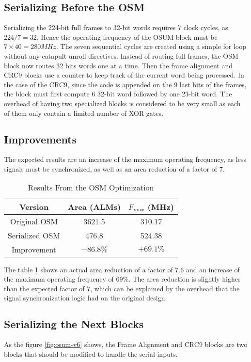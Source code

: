 \subsection{Serializing Before the OSM}

Serializing the 224-bit full frames to 32-bit words requires 7 clock cycles, as \(224/7=32\). Hence the operating frequency of the OSUM block must be \(7\times40=280MHz\). The seven sequential cycles are created using a simple for loop without any catapult unroll directives. Instead of routing full frames, the OSM block now routes 32 bits words one at a time. Then the frame alignment and CRC9 blocks use a counter to keep track of the current word being processed. In the case of the CRC9, since the code is appended on the 9 last bits of the frames, the block must first compute 6 32-bit word followed by one 23-bit word. The overhead of having two specialized blocks is considered to be very small as each of them only contain a limited number of XOR gates.

\subsection{Improvements}
The expected results are an increase of the maximum operating frequency, as less signals must be synchronized, as well as an area reduction of a factor of 7.

\begin{table}[ht]
    \centering
    \begin{tabular}{|c|c|c|}
        \hline
        Version & Area (ALMs) & \(F_{max}\) (MHz) \\
        \hline
        Original OSM & 3621.5 & 310.17 \\
        Serialized OSM & 476.8 & 524.38  \\
        \hline
        Improvement & \(-86.8\%\) & \(+69.1\%\) \\
        \hline
    \end{tabular}
    \caption{Results From the OSM Optimization}
    \label{tab:osm-optimization}
\end{table}

The table \ref{tab:osm-optimization} shows an actual area reduction of a factor of 7.6 and an increase of the maximum operating frequency of 69\%. The area reduction is slightly higher than the expected factor of 7, which can be explained by the overhead that the signal synchronization logic had on the original design. 

\subsection{Serializing the Next Blocks}
As the figure \ref{fig:osum-v6} shows, the Frame Alignment and CRC9 blocks are two blocks that should be modified to handle the serial inputs.

